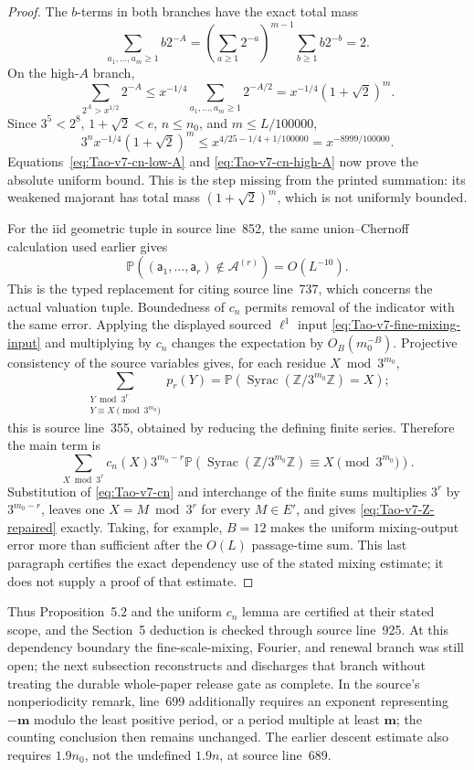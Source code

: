 \begin{proof}
The \(b\)-terms in both branches have the exact total mass
\[
 \sum_{a_1,\ldots,a_m\geq1}b2^{-A}
 =\left(\sum_{a\geq1}2^{-a}\right)^{m-1}
   \sum_{b\geq1}b2^{-b}=2.
\]
On the high-\(A\) branch,
\[
 \sum_{2^A>x^{1/2}}2^{-A}
 \leq x^{-1/4}
       \sum_{a_1,\ldots,a_m\geq1}2^{-A/2}
 =x^{-1/4}(1+\sqrt2)^m.
\]
Since \(3^5<2^8\), \(1+\sqrt2<e\), \(n\leq n_0\), and
\(m\leq L/100000\),
\[
 3^n x^{-1/4}(1+\sqrt2)^m
 \leq x^{4/25-1/4+1/100000}
 =x^{-8999/100000}.
\]
Equations~\eqref{eq:Tao-v7-cn-low-A} and
\eqref{eq:Tao-v7-cn-high-A} now prove the absolute uniform bound.  This is
the step missing from the printed summation: its weakened majorant has total
mass \((1+\sqrt2)^m\), which is not uniformly bounded.

For the iid geometric tuple in source line~852, the same union--Chernoff
calculation used earlier gives
\[
 \mathbb P\!\left((\mathsf a_1,\ldots,\mathsf a_r)
          \notin\mathcal A^{(r)}\right)=O(L^{-10}).
\]
This is the typed replacement for citing source line~737, which concerns the
actual valuation tuple.  Boundedness of \(c_n\) permits removal of the
indicator with the same error.  Applying the displayed sourced
\(\ell^1\) input \eqref{eq:Tao-v7-fine-mixing-input} and multiplying by
\(c_n\) changes the expectation by \(O_B(m_0^{-B})\).  Projective
consistency of the source variables gives, for each residue \(X\bmod3^{m_0}\),
\[
 \sum_{\substack{Y\bmod3^r\\Y\equiv X\pmod{3^{m_0}}}}p_r(Y)
 =\mathbb P\!\left(
   \operatorname{Syrac}(\mathbb Z/3^{m_0}\mathbb Z)=X\right);
\]
this is source line~355, obtained by reducing the defining finite series.
Therefore the main term is
\[
 \sum_{X\bmod3^r}c_n(X)3^{m_0-r}
 \mathbb P\!\left(
   \operatorname{Syrac}(\mathbb Z/3^{m_0}\mathbb Z)
       \equiv X\pmod{3^{m_0}}\right).
\]
Substitution of \eqref{eq:Tao-v7-cn} and interchange of the finite sums
multiplies \(3^r\) by \(3^{m_0-r}\), leaves one \(X=M\bmod3^r\) for every
\(M\in E'\), and gives \eqref{eq:Tao-v7-Z-repaired} exactly.  Taking, for
example, \(B=12\) makes the uniform mixing-output error more than sufficient
after the \(O(L)\) passage-time sum.  This last paragraph certifies the exact
dependency use of the stated mixing estimate; it does not supply a proof of
that estimate.
\end{proof}

Thus Proposition~5.2 and the uniform \(c_n\) lemma are certified at their
stated scope, and the Section~5 deduction is checked through source line~925.
At this dependency boundary the fine-scale-mixing, Fourier, and renewal
branch was still open; the next subsection reconstructs and discharges that
branch without treating the durable whole-paper release gate as complete.
In the source's nonperiodicity remark, line~699 additionally
requires an exponent representing \(-\mathbf m\) modulo the least positive
period, or a period multiple at least \(\mathbf m\); the counting conclusion
then remains unchanged.  The earlier descent estimate also requires
\(1.9n_0\), not the undefined \(1.9n\), at source line~689.

